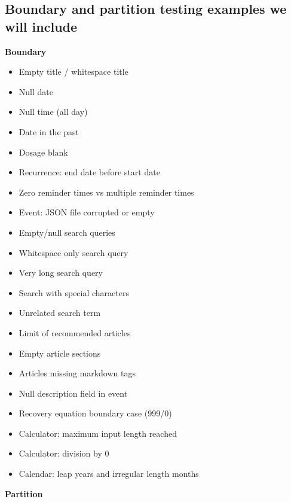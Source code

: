 \documentclass[a4paper,12pt]{article}
\begin{document}
\subsection{Boundary and partition testing examples we will include}
\textbf{Boundary}
\begin{itemize}
    \item Empty title / whitespace title
    \item Null date
    \item Null time (all day)
    \item Date in the past
    \item Dosage blank 
    \item Recurrence: end date before start date
    \item Zero reminder times vs multiple reminder times
    \item Event: JSON file corrupted or empty
    \item Empty/null search queries
    \item Whitespace only search query
    \item Very long search query
    \item Search with special characters
    \item Unrelated search term 
    \item Limit of recommended articles
    \item Empty article sections
    \item Articles missing markdown tags
    \item Null description field in event
    \item Recovery equation boundary case (999/0)
    \item Calculator: maximum input length reached
    \item Calculator: division by 0
    \item Calendar: leap years and irregular length months
    
\end{itemize}
\textbf{Partition}
\end{document}
